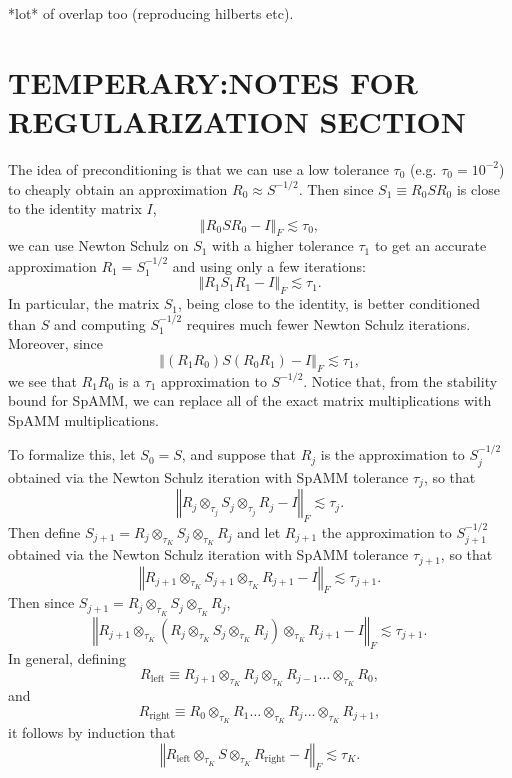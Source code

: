 \documentclass[letterpaper,twocolumn,amsmath,amsfont,amssymb,english,aps,jcp,preprintnumbers,groupaddress,nofootinbib,tightenlines,floatfix]{revtex4}
\theoremstyle{plain}
\theoremstyle{remark}
\theoremstyle{plain}
\begin{document}
 *lot* of overlap too (reproducing hilberts etc).


\section{TEMPERARY:NOTES FOR REGULARIZATION SECTION} 

The idea of preconditioning is that we can use a low tolerance $\tau_{0}$
(e.g. $\tau_{0}=10^{-2}$) to cheaply obtain an approximation $R_{0}\approx S^{-1/2}$.
Then since $S_{1}\equiv R_{0}SR_{0}$ is close to the identity matrix
$I$, 
\[
\left\Vert R_{0}SR_{0}-I\right\Vert _{F}\lesssim\tau_{0},
\]
we can use Newton Schulz on $S_{1}$ with a higher tolerance $\tau_{1}$
to get an accurate approximation $R_{1}=S_{1}^{-1/2}$ and using only
a few iterations:
\[
\left\Vert R_{1}S_{1}R_{1}-I\right\Vert _{F}\lesssim\tau_{1}.
\]
In particular, the matrix $S_{1}$, being close to the identity, is
better conditioned than $S$ and computing $S_{1}^{-1/2}$ requires
much fewer Newton Schulz iterations. Moreover, since 
\[
\left\Vert \left(R_{1}R_{0}\right)S\left(R_{0}R_{1}\right)-I\right\Vert _{F}\lesssim\tau_{1},
\]
we see that $R_{1}R_{0}$ is a $\tau_{1}$ approximation to $S^{-1/2}$.
Notice that, from the stability bound for SpAMM, we can replace all
of the exact matrix multiplications with SpAMM multiplications. 

To formalize this, let $S_{0}=S$, and suppose that $R_{j}$ is the
approximation to $S_{j}^{-1/2}$ obtained via the Newton Schulz iteration
with SpAMM tolerance $\tau_{j}$, so that
\[
\left\Vert R_{j}\otimes_{\tau_{j}}S_{j}\otimes_{\tau_{j}}R_{j}-I\right\Vert _{F}\lesssim\tau_{j}.
\]
Then define $S_{j+1}=R_{j}\otimes_{\tau_{K}}S_{j}\otimes_{\tau_{K}}R_{j}$
and let $R_{j+1}$ the approximation to $S_{j+1}^{-1/2}$ obtained
via the Newton Schulz iteration with SpAMM tolerance $\tau_{j+1}$,
so that 
\[
\left\Vert R_{j+1}\otimes_{\tau_{K}}S_{j+1}\otimes_{\tau_{K}}R_{j+1}-I\right\Vert _{F}\lesssim\tau_{j+1}.
\]
Then since $S_{j+1}=R_{j}\otimes_{\tau_{K}}S_{j}\otimes_{\tau_{K}}R_{j}$,
\[
\left\Vert R_{j+1}\otimes_{\tau_{K}}\left(R_{j}\otimes_{\tau_{K}}S_{j}\otimes_{\tau_{K}}R_{j}\right)\otimes_{\tau_{K}}R_{j+1}-I\right\Vert _{F}\lesssim\tau_{j+1}.
\]
In general, defining 
\[
R_{\text{left}}\equiv R_{j+1}\otimes_{\tau_{K}}R_{j}\otimes_{\tau_{K}}R_{j-1}\dots\otimes_{\tau_{K}}R_{0},
\]
and 
\[
R_{\text{right}}\equiv R_{0}\otimes_{\tau_{K}}R_{1}\dots\otimes_{\tau_{K}}R_{j}\dots\otimes_{\tau_{K}}R_{j+1},
\]
it follows by induction that 
\[
\left\Vert R_{\text{left}}\otimes_{\tau_{K}}S\otimes_{\tau_{K}}R_{\text{right}}-I\right\Vert _{F}\lesssim\tau_{K}.
\]
\end{document}
